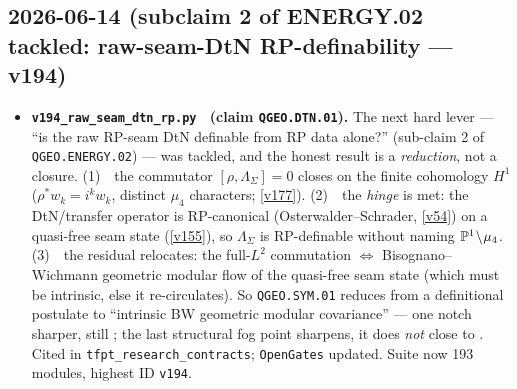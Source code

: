 \subsection*{2026-06-14 (subclaim 2 of ENERGY.02 tackled: raw-seam-DtN RP-definability --- v194)}
\begin{itemize}
\item \textbf{\texttt{v194\_raw\_seam\_dtn\_rp.py} \mO\ (claim \texttt{QGEO.DTN.01}).} The next hard lever ---
  ``is the raw RP-seam DtN definable from RP data alone?'' (sub-claim 2 of \texttt{QGEO.ENERGY.02}) --- was
  tackled, and the honest result is a \emph{reduction}, not a closure. (1)~\mE\ the commutator
  $[\rho,\Lambda_\Sigma]=0$ closes on the finite cohomology $H^1$ ($\rho^*w_k=i^k w_k$, distinct $\mu_4$
  characters; \vref{v177}). (2)~\mE\ the \emph{hinge} is met: the DtN/transfer operator is RP-canonical
  (Osterwalder--Schrader, \vref{v54}) on a quasi-free seam state (\vref{v155}), so $\Lambda_\Sigma$ is
  RP-definable without naming $\mathbb{P}^1\!\setminus\!\mu_4$. (3)~\mO\ the residual relocates: the full-$L^2$
  commutation $\Leftrightarrow$ Bisognano--Wichmann geometric modular flow of the quasi-free seam state
  (which must be intrinsic, else it re-circulates). So \texttt{QGEO.SYM.01} reduces from a definitional
  postulate to ``intrinsic BW geometric modular covariance'' --- one notch sharper, still \mO; the last
  structural fog point sharpens, it does \emph{not} close to \mE. Cited in
  \texttt{tfpt\_research\_contracts}; \texttt{OpenGates} updated. Suite now 193 modules, highest ID
  \texttt{v194}.
\end{itemize}

